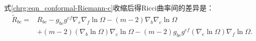 式\eqref{chrg:eqn_conformal-Riemann-c}收缩后得Ricci曲率间的差异是：
\begin{equation}\label{chrg:eqn_conformal-Ricci}
    \begin{aligned}
        \tilde{R}_{bc}=& R_{bc} - {g}_{bc} {g}^{ef}{\nabla}_{e} {\nabla}_f \ln\Omega
        -(m-2) {\nabla}_{b}  {\nabla}_c \ln \Omega \\
        & + (m-2) ({\nabla}_b \ln\Omega) {\nabla}_{c} \ln\Omega
        - (m-2) {g}_{bc} {g}^{ef}({\nabla}_e \ln\Omega){\nabla}_f \ln\Omega .
    \end{aligned}
\end{equation}
